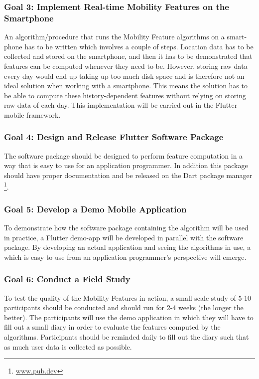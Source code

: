 \subsubsection*{Goal 3: Implement Real-time Mobility Features on the Smartphone}
An algorithm/procedure that runs the Mobility Feature algorithms on a smart-phone has to be written which involves a couple of steps. Location data has to be collected and stored on the smartphone, and then it has to be demonstrated that features can be computed whenever they need to be. However, storing raw data every day would end up taking up too much disk space and is therefore not an ideal solution when working with a smartphone. This means the solution has to be able to compute these history-dependent features without relying on storing raw data of each day. This implementation will be carried out in the Flutter mobile framework.

\subsubsection*{Goal 4: Design and Release Flutter Software Package}
The software package should be designed to perform feature computation in a way that is easy to use for an application programmer. In addition this package should have proper documentation and be released on the Dart package manager \footnote{\url{www.pub.dev}}.

\subsubsection*{Goal 5: Develop a Demo Mobile Application}
To demonstrate how the software package containing the algorithm will be used in practice, a Flutter demo-app will be developed in parallel with the software package. By developing an actual application and seeing the algorithms in use, a which is easy to use from an application programmer's perspective will emerge.

\subsubsection*{Goal 6: Conduct a Field Study}
To test the quality of the Mobility Features in action, a small scale study of 5-10 participants should be conducted and should run for 2-4 weeks (the longer the better). The participants will use the demo application in which they will have to fill out a small diary in order to evaluate the features computed by the algorithms. Participants should be reminded daily to fill out the diary such that as much user data is collected as possible.


